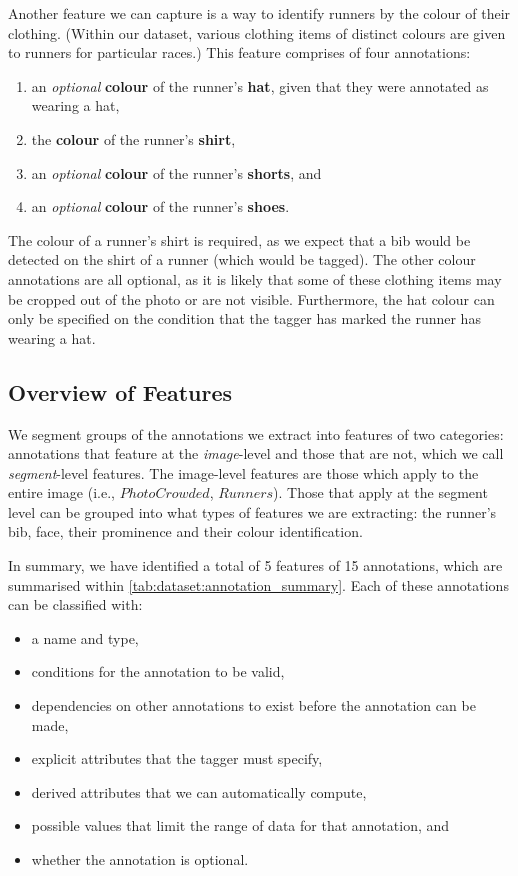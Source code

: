 Another feature we can capture is a way to identify runners by the colour of their clothing. (Within our dataset, various clothing items of distinct colours are given to runners for particular races.) This feature comprises of four annotations:

\begin{enumerate}
  \item an \textit{optional} \textbf{colour} of the runner's \textbf{hat}, given that they were annotated as wearing a hat,
  \item the \textbf{colour} of the runner's \textbf{shirt},
  \item an \textit{optional} \textbf{colour} of the runner's \textbf{shorts}, and
  \item an \textit{optional} \textbf{colour} of the runner's \textbf{shoes}.
\end{enumerate}

The colour of a runner's shirt is required, as we expect that a bib would be detected on the shirt of a runner (which would be tagged). The other colour annotations are all optional, as it is likely that some of these clothing items may be cropped out of the photo or are not visible. Furthermore, the hat colour can only be specified on the condition that the tagger has marked the runner has wearing a hat.

\subsection{Overview of Features}

We segment groups of the annotations we extract into features of two categories: annotations that feature at the \textit{image}-level and those that are not, which we call \textit{segment}-level features. The image-level features are those which apply to the entire image (i.e., $PhotoCrowded$, $Runners$). Those that apply at the segment level can be grouped into what types of features we are extracting: the runner's bib, face, their prominence and their colour identification.

In summary, we have identified a total of 5 features of 15 annotations, which are summarised within \cref{tab:dataset:annotation_summary}. Each of these annotations can be classified with:

\begin{itemize}
\item a name and type,
\item conditions for the annotation to be valid,
\item dependencies on other annotations to exist before the annotation can be made,
\item explicit attributes that the tagger must specify,
\item derived attributes that we can automatically compute,
\item possible values that limit the range of data for that annotation, and
\item whether the annotation is optional.  
\end{itemize}




